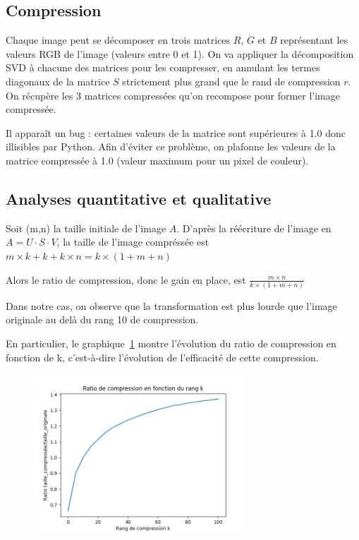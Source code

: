 \documentclass{article}
\begin{document}
\subsection{Compression}
\label{ssec:compr_img}

Chaque image peut se décomposer en trois matrices $R$, $G$ et $B$ représentant les valeurs RGB de l'image (valeurs entre 0 et 1).
On va appliquer la décomposition SVD à chacune des matrices pour les compresser, en annulant les termes diagonaux
de la matrice $S$ strictement plus grand que le rand de compression $r$. On récupère les 3 matrices compressées qu'on
recompose pour former l'image compressée. 

Il apparaît un bug : certaines valeurs de la matrice sont supérieures à 1.0 donc illisibles par Python. 
Afin d'éviter ce problème, on plafonne les valeurs de la matrice compressée à 1.0 (valeur maximum pour un pixel de couleur).

\subsection{Analyses quantitative et qualitative}
\label{ssec:quanti_img}

Soit (m,n) la taille initiale de l'image $A$.
D'après la réécriture de l'image en $A = U \cdot S \cdot V$,
la taille de l'image compréssée est $m \times k + k + k \times n = k \times (1+m+n)$

Alors le ratio de compression, donc le gain en place, est $\frac{m \times n}{k \times (1+m+n)}$ \newline

Dans notre cas, on observe que la transformation est plus lourde que l'image originale au delà du rang 10 de compression.

En particulier, le graphique~\ref{img:ratioCompression} montre l'évolution du ratio de compression en fonction de k, c'est-à-dire l'évolution
de l'efficacité de cette compression.

\begin{figure}[!htb]
  \caption[]{}
  \label{img:ratioCompression}
  \centering
  \includegraphics[width=8cm]{../files/ratio_de_compression.png}
\end{figure}
\end{document}
